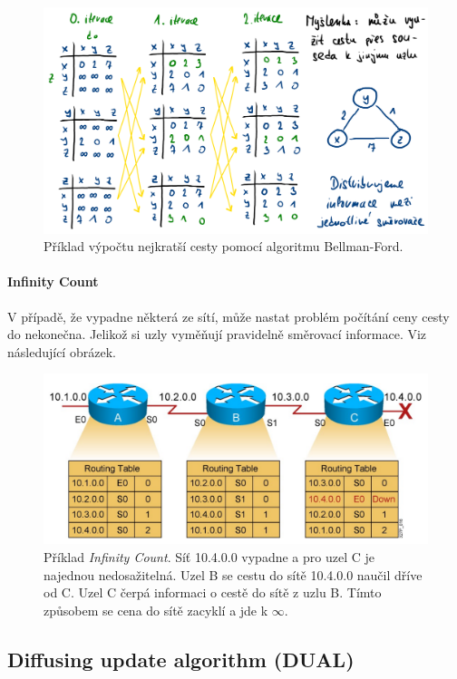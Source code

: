 \begin{figure}[H]
    \centering
    \includegraphics[width=1\linewidth]{bellman_ford_example.pdf}
    \caption{Příklad výpočtu nejkratší cesty pomocí algoritmu Bellman-Ford.}
\end{figure}

\paragraph*{Infinity Count} V případě, že vypadne některá ze sítí, může nastat problém počítání ceny cesty do nekonečna. Jelikož si uzly vyměňují pravidelně směrovací informace. Viz následující obrázek.

\begin{figure}[H]
    \centering
    \includegraphics[width=1\linewidth]{rip_counting_infinity.pdf}
    \caption{Příklad \textit{Infinity Count}. Síť 10.4.0.0 vypadne a pro uzel C je najednou nedosažitelná. Uzel B se cestu do sítě 10.4.0.0 naučil dříve od C. Uzel C čerpá informaci o cestě do sítě z uzlu B. Tímto způsobem se cena do sítě zacyklí a jde k $\infty$.}
\end{figure}

\subsection{Diffusing update algorithm (DUAL)}

